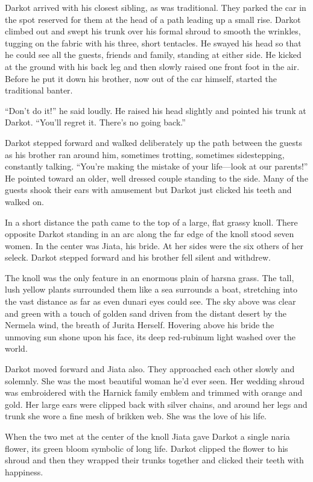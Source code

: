 
Darkot arrived with his closest sibling, as was traditional. They parked the car in the spot
reserved for them at the head of a path leading up a small rise. Darkot climbed out and swept
his trunk over his formal shroud to smooth the wrinkles, tugging on the fabric with his three,
short tentacles. He swayed his head so that he could see all the guests, friends and family,
standing at either side. He kicked at the ground with his back leg and then slowly raised one
front foot in the air. Before he put it down his brother, now out of the car himself, started
the traditional banter.

``Don't do it!'' he said loudly. He raised his head slightly and pointed his trunk at Darkot.
``You'll regret it. There's no going back.''

Darkot stepped forward and walked deliberately up the path between the guests as his brother ran
around him, sometimes trotting, sometimes sidestepping, constantly talking. ``You're making the
mistake of your life---look at our parents!'' He pointed toward an older, well dressed couple
standing to the side. Many of the guests shook their ears with amusement but Darkot just clicked
his teeth and walked on.

In a short distance the path came to the top of a large, flat grassy knoll. There opposite
Darkot standing in an arc along the far edge of the knoll stood seven women. In the center was
Jiata, his bride. At her sides were the six others of her seleck. Darkot stepped forward and his
brother fell silent and withdrew.

The knoll was the only feature in an enormous plain of harsna grass. The tall, lush yellow
plants surrounded them like a sea surrounds a boat, stretching into the vast distance as far as
even dunari eyes could see. The sky above was clear and green with a touch of golden sand driven
from the distant desert by the Nermela wind, the breath of Jurita Herself. Hovering above his
bride the unmoving sun shone upon his face, its deep red-rubinum light washed over the world.

Darkot moved forward and Jiata also. They approached each other slowly and solemnly. She was the
most beautiful woman he'd ever seen. Her wedding shroud was embroidered with the Harnick family
emblem and trimmed with orange and gold. Her large ears were clipped back with silver chains,
and around her legs and trunk she wore a fine mesh of brikken web. She was the love of his life.

When the two met at the center of the knoll Jiata gave Darkot a single naria flower, its green
bloom symbolic of long life. Darkot clipped the flower to his shroud and then they wrapped their
trunks together and clicked their teeth with happiness.

